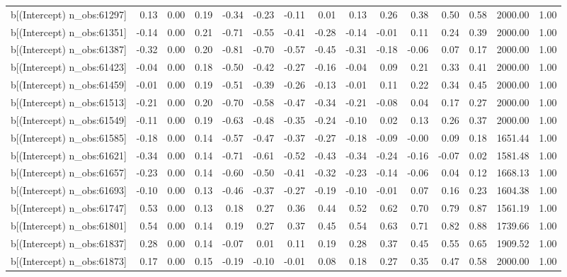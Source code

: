 \begin{table}[ht]
\begin{tabular}{rrrrrrrrrrrrrrr}
  b[(Intercept) n\_obs:61297] & 0.13 & 0.00 & 0.19 & -0.34 & -0.23 & -0.11 & 0.01 & 0.13 & 0.26 & 0.38 & 0.50 & 0.58 & 2000.00 & 1.00 \\ 
  b[(Intercept) n\_obs:61351] & -0.14 & 0.00 & 0.21 & -0.71 & -0.55 & -0.41 & -0.28 & -0.14 & -0.01 & 0.11 & 0.24 & 0.39 & 2000.00 & 1.00 \\ 
  b[(Intercept) n\_obs:61387] & -0.32 & 0.00 & 0.20 & -0.81 & -0.70 & -0.57 & -0.45 & -0.31 & -0.18 & -0.06 & 0.07 & 0.17 & 2000.00 & 1.00 \\ 
  b[(Intercept) n\_obs:61423] & -0.04 & 0.00 & 0.18 & -0.50 & -0.42 & -0.27 & -0.16 & -0.04 & 0.09 & 0.21 & 0.33 & 0.41 & 2000.00 & 1.00 \\ 
  b[(Intercept) n\_obs:61459] & -0.01 & 0.00 & 0.19 & -0.51 & -0.39 & -0.26 & -0.13 & -0.01 & 0.11 & 0.22 & 0.34 & 0.45 & 2000.00 & 1.00 \\ 
  b[(Intercept) n\_obs:61513] & -0.21 & 0.00 & 0.20 & -0.70 & -0.58 & -0.47 & -0.34 & -0.21 & -0.08 & 0.04 & 0.17 & 0.27 & 2000.00 & 1.00 \\ 
  b[(Intercept) n\_obs:61549] & -0.11 & 0.00 & 0.19 & -0.63 & -0.48 & -0.35 & -0.24 & -0.10 & 0.02 & 0.13 & 0.26 & 0.37 & 2000.00 & 1.00 \\ 
  b[(Intercept) n\_obs:61585] & -0.18 & 0.00 & 0.14 & -0.57 & -0.47 & -0.37 & -0.27 & -0.18 & -0.09 & -0.00 & 0.09 & 0.18 & 1651.44 & 1.00 \\ 
  b[(Intercept) n\_obs:61621] & -0.34 & 0.00 & 0.14 & -0.71 & -0.61 & -0.52 & -0.43 & -0.34 & -0.24 & -0.16 & -0.07 & 0.02 & 1581.48 & 1.00 \\ 
  b[(Intercept) n\_obs:61657] & -0.23 & 0.00 & 0.14 & -0.60 & -0.50 & -0.41 & -0.32 & -0.23 & -0.14 & -0.06 & 0.04 & 0.12 & 1668.13 & 1.00 \\ 
  b[(Intercept) n\_obs:61693] & -0.10 & 0.00 & 0.13 & -0.46 & -0.37 & -0.27 & -0.19 & -0.10 & -0.01 & 0.07 & 0.16 & 0.23 & 1604.38 & 1.00 \\ 
  b[(Intercept) n\_obs:61747] & 0.53 & 0.00 & 0.13 & 0.18 & 0.27 & 0.36 & 0.44 & 0.52 & 0.62 & 0.70 & 0.79 & 0.87 & 1561.19 & 1.00 \\ 
  b[(Intercept) n\_obs:61801] & 0.54 & 0.00 & 0.14 & 0.19 & 0.27 & 0.37 & 0.45 & 0.54 & 0.63 & 0.71 & 0.82 & 0.88 & 1739.66 & 1.00 \\ 
  b[(Intercept) n\_obs:61837] & 0.28 & 0.00 & 0.14 & -0.07 & 0.01 & 0.11 & 0.19 & 0.28 & 0.37 & 0.45 & 0.55 & 0.65 & 1909.52 & 1.00 \\ 
  b[(Intercept) n\_obs:61873] & 0.17 & 0.00 & 0.15 & -0.19 & -0.10 & -0.01 & 0.08 & 0.18 & 0.27 & 0.35 & 0.47 & 0.58 & 2000.00 & 1.00 \\ 

\end{tabular}
\end{table}
